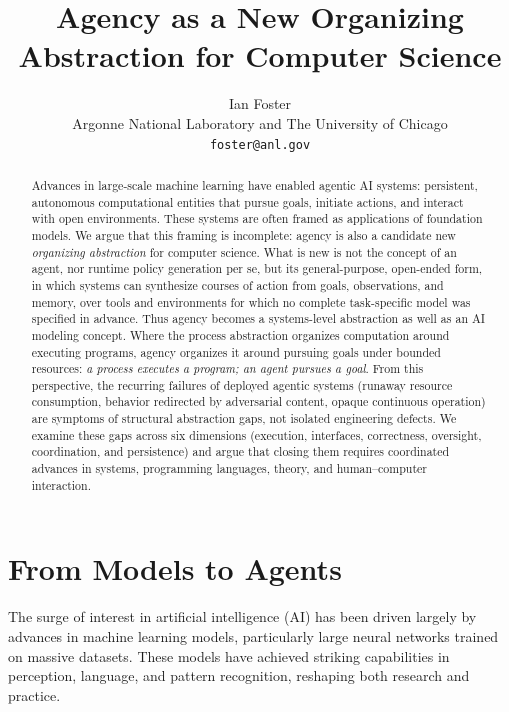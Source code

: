 \documentclass[11pt]{article}
\title{\bfseries Agency as a New Organizing Abstraction for Computer Science}
\author{
Ian Foster\\
\small Argonne National Laboratory and The University of Chicago\\
\small \texttt{foster@anl.gov}
}
\date{}
\begin{document}
\maketitle
\let\thefootnote\relax{}

\vspace{-1em}


\vspace{1em}

\begin{abstract}
Advances in large-scale machine learning have enabled agentic AI systems: persistent, autonomous computational entities that pursue goals, initiate actions, and interact with open environments. These systems are often framed as applications of foundation models. We argue that this framing is incomplete: agency is also a candidate new \textit{organizing abstraction} for computer science. What is new is not the concept of an agent, nor runtime policy generation per se, but its general-purpose, open-ended form, in which systems can synthesize courses of action from goals, observations, and memory, over tools and environments for which no complete task-specific model was specified in advance. Thus agency becomes a systems-level abstraction as well as an AI modeling concept. Where the process abstraction organizes computation around executing programs, agency organizes it around pursuing goals under bounded resources: \textit{a process executes a program; an agent pursues a goal}. From this perspective, the recurring failures of deployed agentic systems (runaway resource consumption, behavior redirected by adversarial content, opaque continuous operation) are symptoms of structural abstraction gaps, not isolated engineering defects. We examine these gaps across six dimensions (execution, interfaces, correctness, oversight, coordination, and persistence) and argue that closing them requires coordinated advances in systems, programming languages, theory, and human--computer interaction.
\end{abstract}

\section{From Models to Agents}

The surge of interest in artificial intelligence (AI) has been driven largely by advances in machine learning models, particularly large neural networks trained on massive datasets. These models have achieved striking capabilities in perception, language, and pattern recognition, reshaping both research and practice. 
\end{document}
